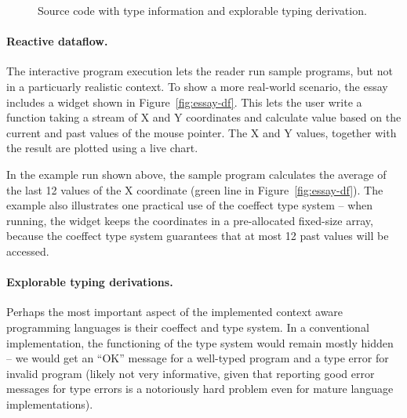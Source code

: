 \begin{figure}[t]
\caption{Source code with type information and explorable typing derivation.}
\label{fig:essay-typing}
\end{figure}


\paragraph{Reactive dataflow.}

The interactive program execution lets the reader run sample programs, but not in a particuarly realistic
context. To show a more real-world scenario, the essay includes a widget shown in Figure~\ref{fig:essay-df}.
This lets the user write a function taking a stream of X and Y coordinates and calculate value
based on the current and past values of the mouse pointer. The X and Y values, together with the
result are plotted using a live chart.

In the example run shown above, the sample program calculates the average of the last 12 values
of the X coordinate (green line in Figure~\ref{fig:essay-df}). The example also illustrates one
practical use of the coeffect type system -- when running, the widget keeps the coordinates in a
pre-allocated fixed-size array, because the coeffect type system guarantees that at most 12 past
values will be accessed.

\paragraph{Explorable typing derivations.}

Perhaps the most important aspect of the implemented context aware programming languages is their
coeffect and type system. In a conventional implementation, the functioning of the type system
would remain mostly hidden -- we would get an ``OK'' message for a well-typed program and a type
error for invalid program (likely not very informative, given that reporting good error messages
for type errors is a notoriously hard problem even for mature language implementations).

